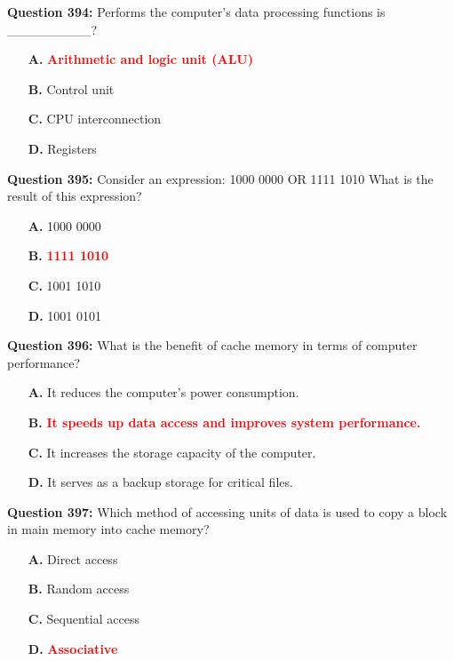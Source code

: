 \documentclass[12pt,a4paper]{article}
\begin{document}
\vspace{0.5cm}

\textbf{Question 394:} Performs the computer's data processing functions is _________?

\begin{itemize}
    \item[\textbf{A.}] \textcolor{red}{\textbf{Arithmetic and logic unit (ALU)}}
    \item[\textbf{B.}] Control unit
    \item[\textbf{C.}] CPU interconnection
    \item[\textbf{D.}] Registers
\end{itemize}

\vspace{0.5cm}

\textbf{Question 395:} Consider an expression: 1000 0000 OR 1111 1010 What is the result of this expression?

\begin{itemize}
    \item[\textbf{A.}] 1000 0000
    \item[\textbf{B.}] \textcolor{red}{\textbf{1111 1010}}
    \item[\textbf{C.}] 1001 1010
    \item[\textbf{D.}] 1001 0101
\end{itemize}

\vspace{0.5cm}

\textbf{Question 396:} What is the benefit of cache memory in terms of computer performance?

\begin{itemize}
    \item[\textbf{A.}] It reduces the computer's power consumption.
    \item[\textbf{B.}] \textcolor{red}{\textbf{It speeds up data access and improves system performance.}}
    \item[\textbf{C.}] It increases the storage capacity of the computer.
    \item[\textbf{D.}] It serves as a backup storage for critical files.
\end{itemize}

\vspace{0.5cm}

\textbf{Question 397:} Which method of accessing units of data is used to copy a block in main memory into cache memory?

\begin{itemize}
    \item[\textbf{A.}] Direct access
    \item[\textbf{B.}] Random access
    \item[\textbf{C.}] Sequential access
    \item[\textbf{D.}] \textcolor{red}{\textbf{Associative}}
\end{itemize}
\end{document}
